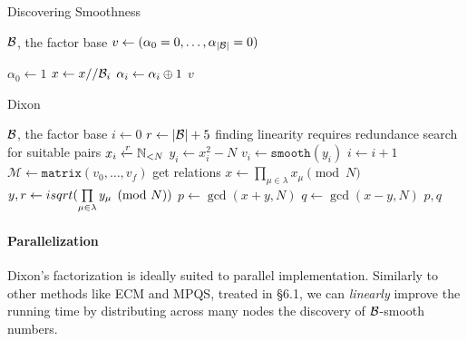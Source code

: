 \begin{algorithm}
  \caption{Discovering Smoothness}
  \begin{algorithmic}[1]
    \Require $\mathcal{B}$, the factor base
      \State $v \gets (\alpha_0 = 0, \ldots, \alpha_{|\mathcal{B}|} = 0)$

       $\alpha_0 \gets 1$ \EndIf
          \EndIf
        \State $x \gets x// \mathcal{B}_i$
        \State $\alpha_i \gets \alpha_i \oplus 1$
      \EndFor
        \State \Return $v$
      \Else
        \State \Return {}
      \EndIf
    \EndProcedure
  \end{algorithmic}
\end{algorithm}

\begin{algorithm}
  \caption{Dixon}
  \begin{algorithmic}[1]
    \Require $\mathcal{B}$, the factor base
    \State $i \gets 0$
    \State $r \gets |\mathcal{B}| + 5$
    \Comment finding linearity requires redundance
    \Comment search for suitable pairs
    \State $x_i \xleftarrow{r} \mathbb{N}_{< N}$
    \State $y_i \gets x_i^2 - N$
    \State $v_i \gets \texttt{smooth}(y_i)$
     $i \gets i+1$ \EndIf
  \EndWhile
  \State $\mathcal{M} \gets \texttt{matrix}(v_0, \ldots, v_f)$
  \Comment get relations
    \State $x \gets \prod\limits_{\mu \in \lambda} x_\mu \pmod{N}$
    \State $y, r \gets isqrt(\prod\limits_{\mu \in \lambda} y_\mu \pmod{N})$
      \State $p \gets \gcd(x+y, N)$
      \State $q \gets \gcd(x-y, N)$
      \State \Return $p, q$
    \EndIf
  \EndFor
  \EndFunction
  \end{algorithmic}
\end{algorithm}

\paragraph{Parallelization}

Dixon's factorization is ideally suited to parallel implementation. Similarly to
other methods like ECM and MPQS, treated in \cite{brent:parallel} \S 6.1,
we can \emph{linearly} improve the running time by distributing across many
nodes the discovery of $\mathcal{B}$-smooth numbers.

